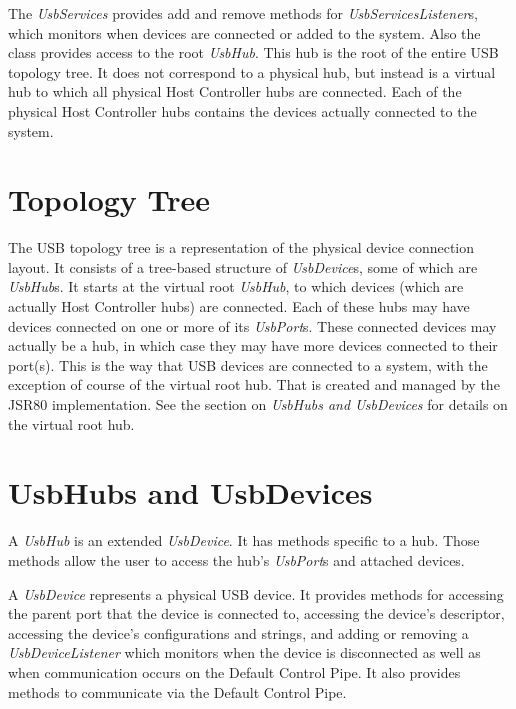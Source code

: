 \documentclass{article}
\begin{document}
The \emph{UsbServices} provides add and remove methods for \emph{UsbServicesListener}s, which
monitors when devices are connected or added to the system.  Also the class provides access
to the root \emph{UsbHub}.  This hub is the root of the entire USB topology tree.  It does
not correspond to a physical hub, but instead is a virtual hub to which all physical Host Controller
hubs are connected.  Each of the physical Host Controller hubs contains the devices actually
connected to the system.

%

\section{Topology Tree}

The USB topology tree is a representation of the physical device connection layout.  It
consists of a tree-based structure of \emph{UsbDevice}s, some of which are \emph{UsbHub}s.
It starts at the virtual root \emph{UsbHub}, to which devices (which are actually
Host Controller hubs) are connected.  Each of these hubs may have devices connected on one or
more of its \emph{UsbPort}s.  These connected devices may actually be a hub, in which case they
may have more devices connected to their port(s).  This is the way that USB devices are connected
to a system, with the exception of course of the virtual root hub.  That is created and managed
by the JSR80 implementation.  See the section on \emph{UsbHubs and UsbDevices} for details on
the virtual root hub.

%

\section{UsbHubs and UsbDevices}

A \emph{UsbHub} is an extended \emph{UsbDevice}.  It has methods specific to a hub.  Those
methods allow the user to access the hub's \emph{UsbPort}s and attached devices.  

A \emph{UsbDevice} represents a physical USB device.  It provides methods for accessing the
parent port that the device is connected to, accessing the device's descriptor, accessing
the device's configurations and strings, and adding or removing a \emph{UsbDeviceListener}
which monitors when the device is disconnected as well as when communication occurs on the
Default Control Pipe.  It also provides methods to communicate via the Default Control Pipe.
\end{document}
